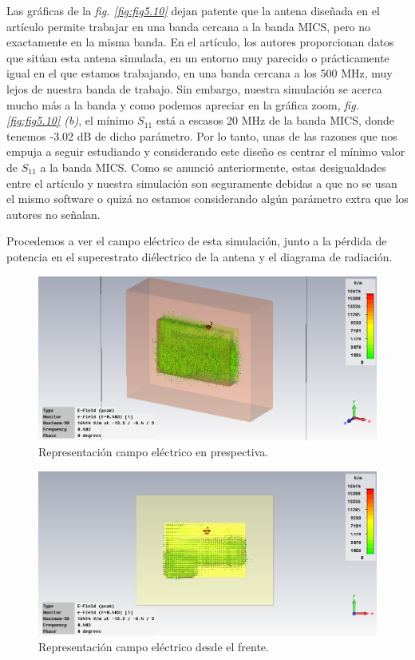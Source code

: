 Las gráficas de la \textit{fig. \ref{fig:fig5.10}} dejan patente que la antena diseñada en el artículo permite trabajar en una banda cercana a la banda MICS, pero no exactamente en la misma banda. En el artículo, los autores proporcionan datos que sitúan esta antena simulada, en un entorno muy parecido o prácticamente igual en el que estamos trabajando, en una banda cercana a los 500 MHz, muy lejos de nuestra banda de trabajo. Sin embargo, nuestra simulación se acerca mucho más a la banda y como podemos apreciar en la gráfica zoom, \textit{fig. \ref{fig:fig5.10} (b)}, el mínimo $S_{11}$ está a escasos 20 MHz de la banda MICS, donde tenemos -3.02 dB de dicho parámetro. Por lo tanto, unas de las razones que nos empuja a seguir estudiando y considerando este diseño es centrar el mínimo valor de $S_{11}$ a la banda MICS. Como se anunció anteriormente, estas desigualdades entre el artículo y nuestra simulación son seguramente debidas a que no se usan el mismo software o quizá no estamos considerando algún parámetro extra que los autores no señalan.

Procedemos a ver el campo eléctrico de esta simulación, junto a la pérdida de potencia en el superestrato diélectrico de la antena y el diagrama de radiación.

\begin{figure}[!htb]
    \centering
    \includegraphics[scale=0.3]{./Simulaciones/original_antenna_muscle/original_serpentine_muscle_E-Field}
    \caption{Representación campo eléctrico en prespectiva.}
    \label{fig:fig5.11}
\end{figure}

\begin{figure}[!htb]
    \centering
    \includegraphics[scale=0.3]{./Simulaciones/original_antenna_muscle/original_serpentine_muscle_E-Field_2}
    \caption{Representación campo eléctrico desde el frente.}
    \label{fig:fig5.12}
\end{figure}

